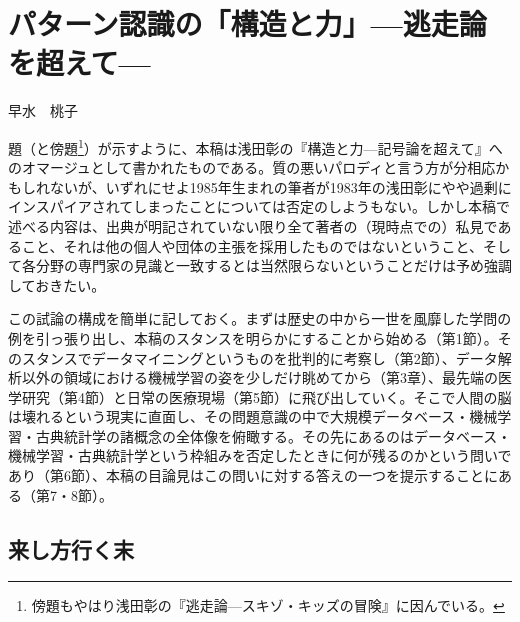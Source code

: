 
\chapter{パターン認識の「構造と力」\Large{---逃走論を超えて---}}

\begin{flushright}
 早水　桃子 %
\end{flushright}

\begin{spacing}{0.6}
\noindent
{\footnotesize{題（と傍題\footnote{傍題もやはり浅田彰の『逃走論---スキゾ・キッズの冒険』に因んでいる。}）が示すように、本稿は浅田彰の『構造と力---記号論を超えて』へのオマージュとして書かれたものである。質の悪いパロディと言う方が分相応かもしれないが、いずれにせよ1985年生まれの筆者が1983年の浅田彰にやや過剰にインスパイアされてしまったことについては否定のしようもない。しかし本稿で述べる内容は、出典が明記されていない限り全て著者の（現時点での）私見であること、それは他の個人や団体の主張を採用したものではないということ、そして各分野の専門家の見識と一致するとは当然限らないということだけは予め強調しておきたい。

\noindent
この試論の構成を簡単に記しておく。まずは歴史の中から一世を風靡した学問の例を引っ張り出し、本稿のスタンスを明らかにすることから始める（第1節）。そのスタンスでデータマイニングというものを批判的に考察し（第2節）、データ解析以外の領域における機械学習の姿を少しだけ眺めてから（第3章）、最先端の医学研究（第4節）と日常の医療現場（第5節）に飛び出していく。そこで人間の脳は壊れるという現実に直面し、その問題意識の中で大規模データベース・機械学習・古典統計学の諸概念の全体像を俯瞰する。その先にあるのはデータベース・機械学習・古典統計学という枠組みを否定したときに何が残るのかという問いであり（第6節）、本稿の目論見はこの問いに対する答えの一つを提示することにある（第7・8節）。
}}
\end{spacing}
 
\section{来し方行く末}
